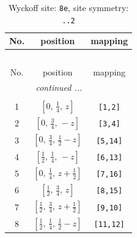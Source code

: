 \documentclass[fleqn,8pt]{jsarticle}
\begin{document}
\begin{longtable}{ccc}
\caption{Wyckoff site: {\tt 8e}, site symmetry: {\tt ..2}}
 \\
 \hline \hline
No. & position & mapping \\ \hline \endfirsthead

\multicolumn{2}{l}{\tablename\ \thetable{}} \\
 \hline \hline
No. & position & mapping \\ \hline \endhead

 \hline \hline
\multicolumn{2}{r}{\footnotesize\it continued ...} \\ \endfoot

 \hline \hline
\multicolumn{2}{r}{} \\ \endlastfoot

1 & $\left[ 0,\, \frac{1}{4},\, z \right]$ & {\tt [1,2]} \\ \hline
2 & $\left[ 0,\, \frac{3}{4},\, - z \right]$ & {\tt [3,4]} \\ \hline
3 & $\left[ 0,\, \frac{3}{4},\, \frac{1}{2} - z \right]$ & {\tt [5,14]} \\ \hline
4 & $\left[ \frac{1}{2},\, \frac{1}{4},\, - z \right]$ & {\tt [6,13]} \\ \hline
5 & $\left[ 0,\, \frac{1}{4},\, z + \frac{1}{2} \right]$ & {\tt [7,16]} \\ \hline
6 & $\left[ \frac{1}{2},\, \frac{3}{4},\, z \right]$ & {\tt [8,15]} \\ \hline
7 & $\left[ \frac{1}{2},\, \frac{3}{4},\, z + \frac{1}{2} \right]$ & {\tt [9,10]} \\ \hline
8 & $\left[ \frac{1}{2},\, \frac{1}{4},\, \frac{1}{2} - z \right]$ & {\tt [11,12]} \\
\end{longtable}
\renewcommand{\arraystretch}{1.2}
\end{document}
